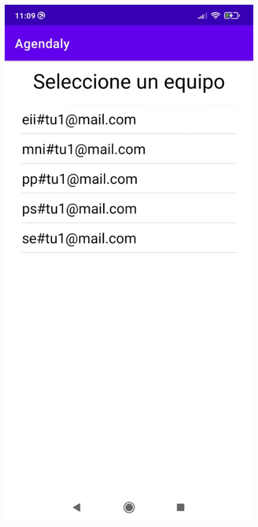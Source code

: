 \documentclass[a4paper,openright,12pt]{article}
\begin{document}
\begin{figure}
    \includegraphics[scale=0.05]{add_to_Team.jpeg}\hfill

\end{figure}
\end{document}
